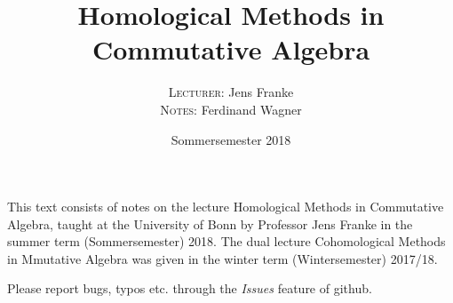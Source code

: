 \documentclass[a4paper,parskip=half,numbers=enddot, DIV=12]{scrreprt}
\title{Homological Methods in Commutative Algebra}
\author{\textsc{Lecturer:} Jens Franke\\
	\textsc{Notes:} Ferdinand Wagner}
\date{Sommersemester 2018}
\begin{document}
\maketitle
{}

\thispagestyle{plain}
This text consists of notes on the lecture Homological Methods in Commutative Algebra, taught at the University of Bonn by Professor Jens Franke in the summer term (Sommersemester) 2018. The dual lecture Cohomological Methods in Mmutative Algebra was given in the winter term (Wintersemester) 2017/18.

Please report bugs, typos etc. through the \emph{Issues} feature of github.

\tableofcontents

\end{document}
